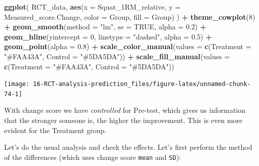 \documentclass[
]{book}
\newenvironment{Shaded}{\begin{snugshade}}{\end{snugshade}}
\newcommand{\DataTypeTok}[1]{\textcolor[rgb]{0.13,0.29,0.53}{#1}}
\newcommand{\DecValTok}[1]{\textcolor[rgb]{0.00,0.00,0.81}{#1}}
\newcommand{\FloatTok}[1]{\textcolor[rgb]{0.00,0.00,0.81}{#1}}
\newcommand{\KeywordTok}[1]{\textcolor[rgb]{0.13,0.29,0.53}{\textbf{#1}}}
\newcommand{\NormalTok}[1]{#1}
\newcommand{\OperatorTok}[1]{\textcolor[rgb]{0.81,0.36,0.00}{\textbf{#1}}}
\newcommand{\OtherTok}[1]{\textcolor[rgb]{0.56,0.35,0.01}{#1}}
\newcommand{\StringTok}[1]{\textcolor[rgb]{0.31,0.60,0.02}{#1}}
\begin{document}
\begin{Shaded}
\begin{Highlighting}[]
\KeywordTok{ggplot}\NormalTok{(}
\NormalTok{  RCT\_data,}
  \KeywordTok{aes}\NormalTok{(}\DataTypeTok{x =}\NormalTok{ Squat\_1RM\_relative, }\DataTypeTok{y =}\NormalTok{ Measured\_score.Change, }\DataTypeTok{color =}\NormalTok{ Group, }\DataTypeTok{fill =}\NormalTok{ Group)}
\NormalTok{) }\OperatorTok{+}
\StringTok{  }\KeywordTok{theme\_cowplot}\NormalTok{(}\DecValTok{8}\NormalTok{) }\OperatorTok{+}
\StringTok{  }\KeywordTok{geom\_smooth}\NormalTok{(}\DataTypeTok{method =} \StringTok{"lm"}\NormalTok{, }\DataTypeTok{se =} \OtherTok{TRUE}\NormalTok{, }\DataTypeTok{alpha =} \FloatTok{0.2}\NormalTok{) }\OperatorTok{+}
\StringTok{  }\KeywordTok{geom\_hline}\NormalTok{(}\DataTypeTok{yintercept =} \DecValTok{0}\NormalTok{, }\DataTypeTok{linetype =} \StringTok{"dashed"}\NormalTok{, }\DataTypeTok{alpha =} \FloatTok{0.5}\NormalTok{) }\OperatorTok{+}
\StringTok{  }\KeywordTok{geom\_point}\NormalTok{(}\DataTypeTok{alpha =} \FloatTok{0.8}\NormalTok{) }\OperatorTok{+}
\StringTok{  }\KeywordTok{scale\_color\_manual}\NormalTok{(}\DataTypeTok{values =} \KeywordTok{c}\NormalTok{(}\DataTypeTok{Treatment =} \StringTok{"\#FAA43A"}\NormalTok{, }\DataTypeTok{Control =} \StringTok{"\#5DA5DA"}\NormalTok{)) }\OperatorTok{+}
\StringTok{  }\KeywordTok{scale\_fill\_manual}\NormalTok{(}\DataTypeTok{values =} \KeywordTok{c}\NormalTok{(}\DataTypeTok{Treatment =} \StringTok{"\#FAA43A"}\NormalTok{, }\DataTypeTok{Control =} \StringTok{"\#5DA5DA"}\NormalTok{))}
\end{Highlighting}
\end{Shaded}

\begin{center}\texttt{[image: 16-RCT-analysis-prediction\_files/figure-latex/unnamed-chunk-74-1]} \end{center}

With change score we have \emph{controlled} for Pre-test, which gives us information that the stronger someone is, the higher the improvement. This is even more evident for the Treatment group.

Let's do the usual analysis and check the effects. Let's first perform the method of the differences (which uses change score \texttt{mean} and \texttt{SD}):
\end{document}
